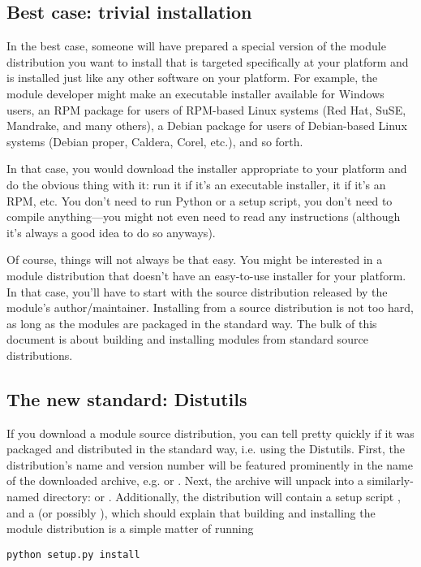 \documentclass{howto}
\begin{document}
\subsection{Best case: trivial installation}
\label{trivial-inst}

In the best case, someone will have prepared a special version of the
module distribution you want to install that is targeted specifically at
your platform and is installed just like any other software on your
platform.  For example, the module developer might make an executable
installer available for Windows users, an RPM package for users of
RPM-based Linux systems (Red Hat, SuSE, Mandrake, and many others), a
Debian package for users of Debian-based Linux systems (Debian proper,
Caldera, Corel, etc.), and so forth.

In that case, you would download the installer appropriate to your
platform and do the obvious thing with it: run it if it's an executable
installer,  it if it's an RPM, etc.  You don't need
to run Python or a setup script, you don't need to compile
anything---you might not even need to read any instructions (although
it's always a good idea to do so anyways).

Of course, things will not always be that easy.  You might be interested
in a module distribution that doesn't have an easy-to-use installer for
your platform.  In that case, you'll have to start with the source
distribution released by the module's author/maintainer.  Installing
from a source distribution is not too hard, as long as the modules are
packaged in the standard way.  The bulk of this document is about
building and installing modules from standard source distributions.


\subsection{The new standard: Distutils}
\label{new-standard}

If you download a module source distribution, you can tell pretty
quickly if it was packaged and distributed in the standard way, i.e.
using the Distutils.  First, the distribution's name and version number
will be featured prominently in the name of the downloaded archive, e.g.
 or .  Next, the archive
will unpack into a similarly-named directory:  or
.  Additionally, the distribution will contain a
setup script , and a  (or possibly
), which should explain that building and installing the
module distribution is a simple matter of running
\begin{verbatim}
python setup.py install
\end{verbatim}
\end{document}
